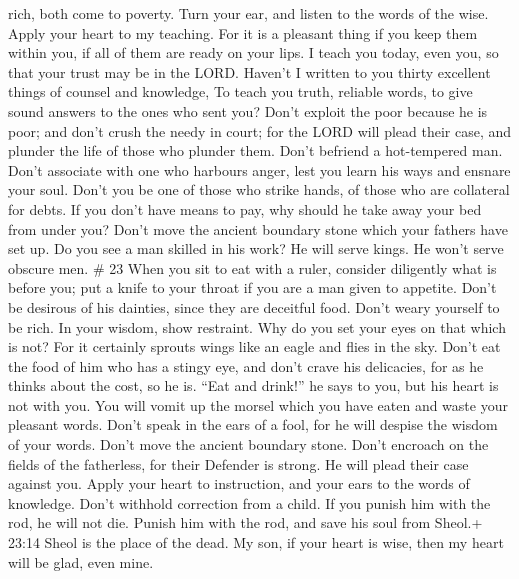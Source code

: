 rich, both come to poverty.  Turn your ear, and listen to
the words of the wise. Apply your heart to my teaching. 
For it is a pleasant thing if you keep them within you, if all of them
are ready on your lips.  I teach you today, even you, so
that your trust may be in the LORD.  Haven't I written to
you thirty excellent things of counsel and knowledge,  To
teach you truth, reliable words, to give sound answers to the ones who
sent you?  Don't exploit the poor because he is poor; and
don't crush the needy in court;  for the LORD will plead
their case, and plunder the life of those who plunder them.
 Don't befriend a hot-tempered man. Don't associate with
one who harbours anger,  lest you learn his ways and
ensnare your soul.  Don't you be one of those who strike
hands, of those who are collateral for debts.  If you don't
have means to pay, why should he take away your bed from under you?
 Don't move the ancient boundary stone which your fathers
have set up.  Do you see a man skilled in his work? He will
serve kings. He won't serve obscure men. \# 23  When you sit
to eat with a ruler, consider diligently what is before you;
 put a knife to your throat if you are a man given to
appetite.  Don't be desirous of his dainties, since they are
deceitful food.  Don't weary yourself to be rich. In your
wisdom, show restraint.  Why do you set your eyes on that
which is not? For it certainly sprouts wings like an eagle and flies in
the sky.  Don't eat the food of him who has a stingy eye,
and don't crave his delicacies,  for as he thinks about the
cost, so he is. ``Eat and drink!'' he says to you, but his heart is not
with you.  You will vomit up the morsel which you have eaten
and waste your pleasant words.  Don't speak in the ears of a
fool, for he will despise the wisdom of your words.  Don't
move the ancient boundary stone. Don't encroach on the fields of the
fatherless,  for their Defender is strong. He will plead
their case against you.  Apply your heart to instruction,
and your ears to the words of knowledge.  Don't withhold
correction from a child. If you punish him with the rod, he will not
die.  Punish him with the rod, and save his soul from
Sheol.+ 23:14 Sheol is the place of the dead.  My son, if
your heart is wise, then my heart will be glad, even mine. 
